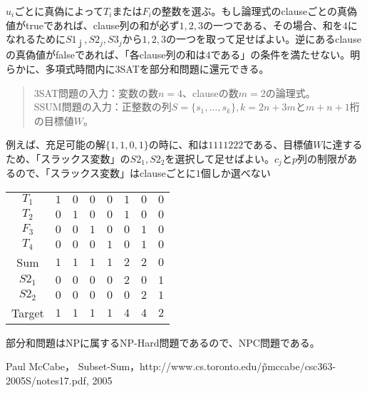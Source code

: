 \documentclass{jsarticle}
\begin{document}
$u_{i}$ごとに真偽によって$T_{i}$または$F_{i}$の整数を選ぶ。もし論理式のclauseごとの真偽値がtrueであれば、clause列の和が必ず${1,2,3}$の一つである、その場合、和を$4$になれるために$S1_{ｊ},S2_{j},S3_{j}$から${1,2,3}$の一つを取って足せばよい。逆にあるclauseの真偽値がfalseであれば、「各clause列の和は4である」の条件を満たせない。明らかに、多項式時間内に3SATを部分和問題に還元できる。
\begin{quote}
3SAT問題の入力：変数の数$n=4$、clauseの数$m=2$の論理式。\\
SSUM問題の入力：正整数の列$S=\{s_{1},\dots,s_{k}\},k=2n+3m$と$m+n+1$桁の目標値$W$。
\end{quote}

例えば、充足可能の解$\{1,1,0,1\}$の時に、和は$1111222$である、目標値$W$に達するため、「スラックス変数」の$S2_{1},S2_{2}$を選択して足せばよい。$c_{j}$と$p$列の制限があるので、「スラックス変数」はclauseごとに$1$個しか選べない

\begin{center}
\begin{tabular}{ c| c c c c c c|c }
  $T_{1}$ & $1$ & $0$ & $0$ & $0$ & $1$ & $0$ & $0$\\
  $T_{2}$ & $0$ & $1$ & $0$ & $0$ & $1$ & $0$ & $0$\\
  $F_{3}$ & $0$ & $0$ & $1$ & $0$ & $0$ & $1$ & $0$\\
  $T_{4}$ & $0$ & $0$ & $0$ & $1$ & $0$ & $1$ & $0$\\
  \hline
  Sum & $1$ & $1$ & $1$ & $1$ & $2$ & $2$ & $0$\\
  \hline
  $S2_{1}$ & $0$ & $0$ & $0$ & $0$ & $2$ & $0$ & $1$\\
  $S2_{2}$ & $0$ & $0$ & $0$ & $0$ & $0$ & $2$ & $1$\\
  \hline
  Target & $1$ & $1$ & $1$ & $1$ & $4$ & $4$ & $2$\\
\end{tabular}
\end{center}

部分和問題はNPに属するNP-Hard問題であるので、NPC問題である。

\begin{thebibliography}{99}
 Paul McCabe，
	Subset-Sum，http://www.cs.toronto.edu/\~pmccabe/csc363-2005S/notes17.pdf, 2005
\end{thebibliography}
\end{document}
